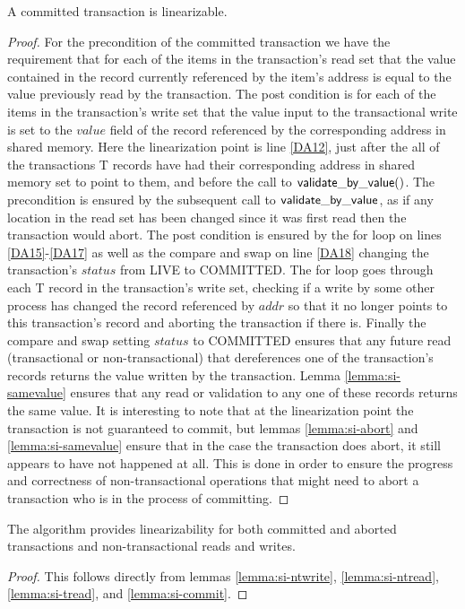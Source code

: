 \begin{lemma}
\label{lemma:si-commit}
A committed transaction is linearizable.
\end{lemma}
\begin{proof}
For the precondition of the committed transaction we have the requirement
that for each of the items in the transaction's read set that the value
contained in the record currently referenced by the item's address is equal to the value 
previously read by the transaction.
The post condition is for each of the items in the transaction's write set
that the value input to the transactional write is set to the $\mathit{value}$ field of the record
referenced by the corresponding address in shared memory.
Here the linearization point is line \ref{DA12}, just after the all of the transactions T records
have had their corresponding address in shared memory set to point to them, and before the call to
$\sf{validate\_by\_value}()$.
The precondition is ensured by the subsequent call to $\sf{validate\_by\_value}$,
as if any location in the read set has been changed since it was first read then
the transaction would abort.
The post condition is ensured by the for loop on lines \ref{DA15}-\ref{DA17} as well
as the compare and swap on line \ref{DA18} changing the transaction's $\mathit{status}$
from LIVE to COMMITTED.
The for loop goes through each T record in the transaction's write set, checking
if a write by some other process has changed the record referenced by $\mathit{addr}$ so that it no longer points
to this transaction's record and aborting the transaction
if there is.
Finally the compare and swap setting $\mathit{status}$ to COMMITTED ensures
that any future read (transactional or non-transactional) that dereferences one of
the transaction's records returns the value written by the transaction.
Lemma \ref{lemma:si-samevalue} ensures that any read or validation to any one of these
records returns the same value.
It is interesting to note that at the linearization point the transaction is not
guaranteed to commit, but lemmas \ref{lemma:si-abort} and \ref{lemma:si-samevalue}
ensure that in the case the transaction does abort, it still appears to have not happened
at all.
This is done in order to ensure the progress and correctness of non-transactional operations that might
need to abort a transaction who is in the process of committing.
\end{proof}



\begin{theorem}
\label{theorem:si-lin}
The algorithm provides linearizability for both committed and aborted transactions
and non-transactional reads and writes.
\end{theorem}
\begin{proof}
This follows directly from lemmas \ref{lemma:si-ntwrite}, \ref{lemma:si-ntread}, \ref{lemma:si-tread},
and \ref{lemma:si-commit}.
\end{proof}



